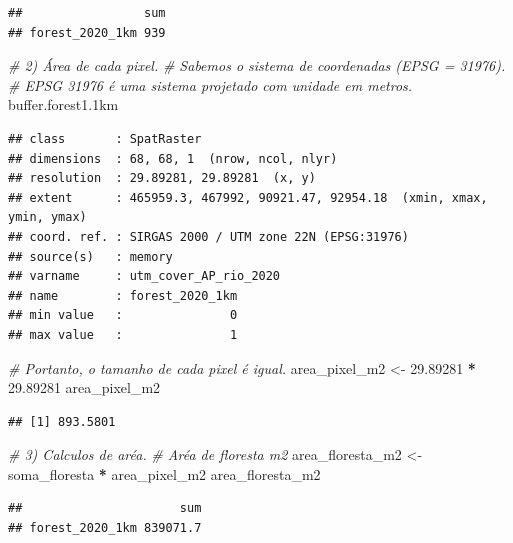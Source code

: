 \documentclass[
]{article}
\newenvironment{Shaded}{\begin{snugshade}}{\end{snugshade}}
\newcommand{\CommentTok}[1]{\textcolor[rgb]{0.56,0.35,0.01}{\textit{#1}}}
\newcommand{\FloatTok}[1]{\textcolor[rgb]{0.00,0.00,0.81}{#1}}
\newcommand{\NormalTok}[1]{#1}
\newcommand{\OtherTok}[1]{\textcolor[rgb]{0.56,0.35,0.01}{#1}}
\newcommand{\SpecialCharTok}[1]{\textcolor[rgb]{0.81,0.36,0.00}{\textbf{#1}}}
\begin{document}
\begin{verbatim}
##                 sum
## forest_2020_1km 939
\end{verbatim}

\begin{Shaded}
\begin{Highlighting}[]
\CommentTok{\# 2) Área de cada pixel.}
\CommentTok{\# Sabemos o sistema de coordenadas (EPSG = 31976).}
\CommentTok{\# EPSG 31976 é uma sistema projetado com unidade em metros.}
\NormalTok{buffer.forest1}\FloatTok{.1}\NormalTok{km}
\end{Highlighting}
\end{Shaded}

\begin{verbatim}
## class       : SpatRaster 
## dimensions  : 68, 68, 1  (nrow, ncol, nlyr)
## resolution  : 29.89281, 29.89281  (x, y)
## extent      : 465959.3, 467992, 90921.47, 92954.18  (xmin, xmax, ymin, ymax)
## coord. ref. : SIRGAS 2000 / UTM zone 22N (EPSG:31976) 
## source(s)   : memory
## varname     : utm_cover_AP_rio_2020 
## name        : forest_2020_1km 
## min value   :               0 
## max value   :               1
\end{verbatim}

\begin{Shaded}
\begin{Highlighting}[]
\CommentTok{\# Portanto, o tamanho de cada pixel é igual.}
\NormalTok{area\_pixel\_m2 }\OtherTok{\textless{}{-}} \FloatTok{29.89281} \SpecialCharTok{*} \FloatTok{29.89281}
\NormalTok{area\_pixel\_m2}
\end{Highlighting}
\end{Shaded}

\begin{verbatim}
## [1] 893.5801
\end{verbatim}

\begin{Shaded}
\begin{Highlighting}[]
\CommentTok{\# 3) Calculos de aréa.}
\CommentTok{\# Aréa de floresta m2}
\NormalTok{area\_floresta\_m2 }\OtherTok{\textless{}{-}}\NormalTok{ soma\_floresta }\SpecialCharTok{*}\NormalTok{ area\_pixel\_m2}
\NormalTok{area\_floresta\_m2}
\end{Highlighting}
\end{Shaded}

\begin{verbatim}
##                      sum
## forest_2020_1km 839071.7
\end{verbatim}
\end{document}
